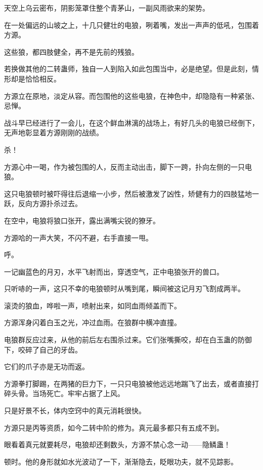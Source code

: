
\begin{this_body}



天空上乌云密布，阴影笼罩住整个青茅山，一副风雨欲来的架势。

在一处偏远的山坡之上，十几只健壮的电狼，咧着嘴，发出一声声的低吼，包围着方源。

这些狼，都四肢健全，再不是先前的残狼。

若换做其他的二转蛊师，独自一人到陷入如此包围当中，必是绝望。但是此刻，情形却是恰恰相反。

方源立在原地，淡定从容。而包围他的这些电狼，在神色中，却隐隐有一种紧张、忌惮。

战斗早已经进行了一会儿，在这个鲜血淋漓的战场上，有好几头的电狼已经倒下，无声地彰显着方源刚刚的战绩。

杀！

方源心中一喝，作为被包围的人，反而主动出击，脚下一跨，扑向左侧的一只电狼。

这只电狼顿时被吓得往后退缩一小步，然后被激发了凶性，矫健有力的四肢猛地一跃，反向方源扑杀过去。

在空中，电狼将狼口张开，露出满嘴尖锐的獠牙。

方源哈的一声大笑，不闪不避，右手直接一甩。

呼。

一记幽蓝色的月刃，水平飞射而出，穿透空气，正中电狼张开的兽口。

只听哧的一声，这只不幸的电狼顿时从嘴到尾，瞬间被这记月刃飞割成两半。

滚烫的狼血，哗啦一声，喷射出来，如同血雨倾盖而下。

方源浑身闪着白玉之光，冲过血雨。在狼群中横冲直撞。

电狼群反应过来，从他的前后左右围杀过来。它们张嘴撕咬，却在白玉蛊的防御下，咬碎了自己的牙齿。

它们的爪子亦是无功而返。

方源拳打脚踢，在两猪的巨力下，一只只电狼被他远远地踹飞了出去，或者直接打碎头骨。当场死亡。牢牢占据了上风。

只是好景不长，体内空窍中的真元消耗很快。

方源只是丙等资质，如今二转中阶的修为。真元最多都只有五成不到。

眼看着真元就要耗尽，电狼却还剩数头，方源不禁心念一动——隐鳞蛊！

顿时。他的身形就如水光波动了一下，渐渐隐去，眨眼功夫，就不见踪影。


\end{this_body}
